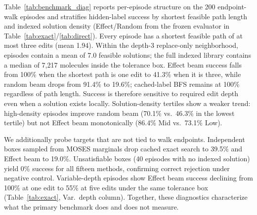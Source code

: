 \documentclass[journal=jcisd8,manuscript=article,email=false]{achemso}
\begin{document}
Table~\ref{tab:benchmark_diag} reports per-episode structure on the 200 endpoint-walk episodes and stratifies hidden-label success by shortest feasible path length and indexed solution density (Effect/Random from the frozen evaluator in Table~\ref{tab:exact}/\ref{tab:direct}). Every episode has a shortest feasible path of at most three edits (mean 1.94). Within the depth-3 replace-only neighborhood, episodes contain a mean of 7.0 feasible solutions; the full indexed library contains a median of 7{,}217 molecules inside the tolerance box. Effect beam success falls from 100\% when the shortest path is one edit to 41.3\% when it is three, while random beam drops from 91.4\% to 19.6\%; cached-label BFS remains at 100\% regardless of path length. Success is therefore sensitive to required edit depth even when a solution exists locally. Solution-density tertiles show a weaker trend: high-density episodes improve random beam (70.1\% vs.\ 46.3\% in the lowest tertile) but not Effect beam monotonically (86.4\% Mid vs.\ 73.1\% Low).

We additionally probe targets that are not tied to walk endpoints. Independent boxes sampled from MOSES marginals drop cached exact search to 39.5\% and Effect beam to 19.0\%. Unsatisfiable boxes (40 episodes with no indexed solution) yield 0\% success for all fifteen methods, confirming correct rejection under negative control. Variable-depth episodes show Effect beam success declining from 100\% at one edit to 55\% at five edits under the same tolerance box (Table~\ref{tab:exact}, Var.\ depth column). Together, these diagnostics characterize what the primary benchmark does and does not measure.
\end{document}
